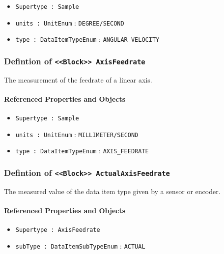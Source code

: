 \begin{itemize}
\item \texttt{Supertype : Sample}

\item \texttt{units : UnitEnum} : \texttt{DEGREE/SECOND}

\item \texttt{type : DataItemTypeEnum} : \texttt{ANGULAR_VELOCITY}

\end{itemize}
\FloatBarrier
\subsubsection{Defintion of \texttt{<<Block>> AxisFeedrate}}
  \label{type:AxisFeedrate}

\FloatBarrier

The measurement of the feedrate of a linear axis.

\FloatBarrier
\paragraph{Referenced Properties and Objects}

\begin{itemize}
\item \texttt{Supertype : Sample}

\item \texttt{units : UnitEnum} : \texttt{MILLIMETER/SECOND}

\item \texttt{type : DataItemTypeEnum} : \texttt{AXIS_FEEDRATE}

\end{itemize}
\FloatBarrier
\subsubsection{Defintion of \texttt{<<Block>> ActualAxisFeedrate}}
  \label{type:ActualAxisFeedrate}

\FloatBarrier

The measured value of the data item type given by a sensor or encoder.

\FloatBarrier
\paragraph{Referenced Properties and Objects}

\begin{itemize}
\item \texttt{Supertype : AxisFeedrate}

\item \texttt{subType : DataItemSubTypeEnum} : \texttt{ACTUAL}

\end{itemize}
\FloatBarrier
